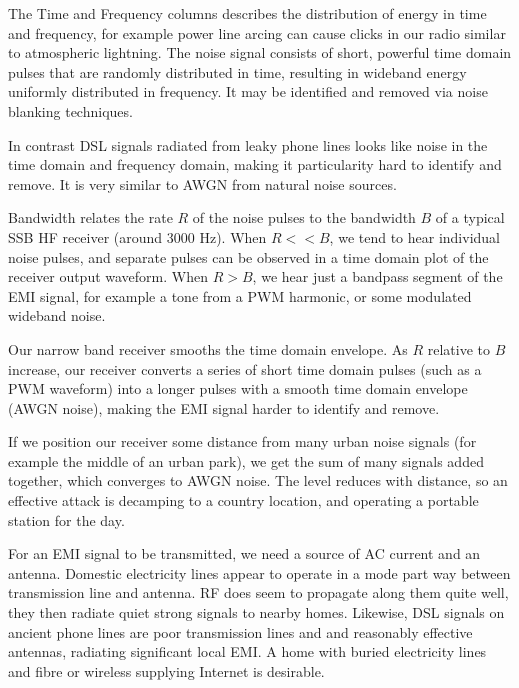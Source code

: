 \documentclass{article}
\begin{document}
The Time and Frequency columns describes the distribution of energy in time and frequency, for example power line arcing can cause clicks in our radio similar to atmospheric lightning.  The noise signal consists of short, powerful time domain pulses that are randomly distributed in time, resulting in wideband energy uniformly distributed in frequency. It may be identified and removed via noise blanking techniques.

In contrast DSL signals radiated from leaky phone lines looks like noise in the time domain and frequency domain, making it particularity hard to identify and remove.  It is very similar to AWGN from natural noise sources.

Bandwidth relates the rate $R$ of the noise pulses to the bandwidth $B$ of a typical SSB HF receiver (around 3000 Hz).  When $R<<B$, we tend to hear individual noise pulses, and separate pulses can be observed in a time domain plot of the receiver output waveform.  When $R>B$, we hear just a bandpass segment of the EMI signal, for example a tone from a PWM harmonic, or some modulated wideband noise.

Our narrow band receiver smooths the time domain envelope. As $R$ relative to $B$ increase, our receiver converts a series of short time domain pulses (such as a PWM waveform) into a longer pulses with a smooth time domain envelope (AWGN noise), making the EMI signal harder to identify and remove.

If we position our receiver some distance from many urban noise signals (for example the middle of an urban park), we get the sum of many signals added together, which converges to AWGN noise.  The level reduces with distance, so an effective attack is decamping to a country location, and operating a portable station for the day.

For an EMI signal to be transmitted, we need a source of AC current and an antenna. Domestic electricity lines appear to operate in a mode part way between transmission line and antenna.  RF does seem to propagate along them quite well, they then radiate quiet strong signals to nearby homes.  Likewise, DSL signals on ancient phone lines are poor transmission lines and and reasonably effective antennas, radiating significant local EMI. A home with buried electricity lines and fibre or wireless supplying Internet is desirable.
\end{document}

